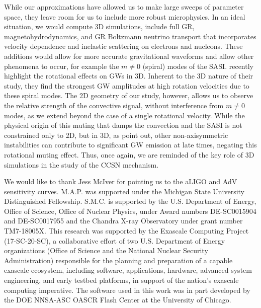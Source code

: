 \documentclass[twocolumn,times]{aastex62}  %
\begin{document}
While our approximations have allowed us to make large sweeps of parameter space, they leave room for us to include more robust microphysics.  In an ideal situation, we would compute 3D simulations, include full GR, magnetohydrodynamics, and GR Boltzmann neutrino transport that incorporates velocity dependence and inelastic scattering on electrons and nucleons.  These additions would allow for more accurate gravitational waveforms and allow other phenomena to occur, for example the $m\ne 0$ (spiral) modes of the SASI. \citet{andresen:2018} recently highlight the rotational effects on GWs in 3D.  Inherent to the 3D nature of their study, they find the strongest GW amplitudes at high rotation velocities due to these spiral modes.  The 2D geometry of our study, however, allows us to observe the relative strength of the convective signal, without interference from $m\ne 0$ modes, as we extend beyond the case of a single rotational velocity.
While the physical origin of this muting that damps the convection and the SASI is not constrained only to 2D, but in 3D, as \citet{andresen:2018} point out, other non-axisymmetric instabilities can contribute to significant GW emission at late times, negating this rotational muting effect.
Thus, once again, we are reminded of the key role of 3D simulations in the study of the CCSN mechanism.

\acknowledgements

We would like to thank Jess McIver for pointing us to the aLIGO and AdV sensitivity curves.  M.A.P. was supported under the Michigan State University Distinguished Fellowship. 
S.M.C. is supported by the U.S. Department of Energy, Office of Science, Office of Nuclear Physics,
under Award numbers DE-SC0015904 and DE-SC0017955 and the Chandra
X-ray Observatory under grant number TM7-18005X.
This research was supported by the Exascale Computing Project (17-SC-20-SC), a collaborative effort of two U.S. Department of Energy organizations (Office of Science and the National Nuclear Security Administration) responsible for the planning and preparation of a capable exascale ecosystem, including software, applications, hardware, advanced system engineering, and early testbed platforms, in support of the nation’s exascale computing imperative.
The software used in this
work was in part developed by the DOE NNSA-ASC OASCR Flash Center at
the University of Chicago.  

    





\end{document}
